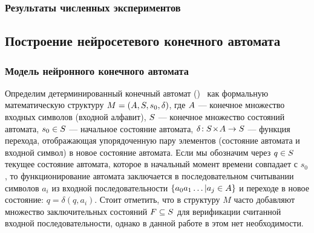 \subsubsection{Результаты численных экспериментов}

\begin{figure}[ht]
    \caption{}
    \label{img:ica_learning_weights}
\end{figure}

\begin{figure}[ht]
    \caption{}
    \label{img:ica_learning_progress}
\end{figure}

\begin{figure}[ht]
    \caption{}
    \label{img:ica_modeling_result}
\end{figure}


\subsection{Построение нейросетевого конечного автомата}


\subsubsection{Модель нейронного конечного автомата}

Определим детерминированный конечный автомат ()~\cite{Hopcroft2008} как формальную математическую структуру $M = \left( A, S, s_{0}, \delta \right)$, где $A$ --- конечное множество входных символов (входной алфавит), $S$ --- конечное множество состояний автомата, $s_{0} \in S$ --- начальное состояние автомата, $\delta\!: S\!\times\!A \to S$ --- функция перехода, отображающая упорядоченную пару элементов (состояние автомата и входной символ) в новое состояние автомата. Если мы обозначим через $q \in S$ текущее состояние автомата, которое в начальный момент времени совпадает с $s_{0}$, то функционирование автомата заключается в последовательном считывании символов $a_{i}$ из входной последовательности $\left\{ a_{0} a_{1} \ldots | a_{j} \in A \right\}$ и переходе в новое состояние: $q = \delta \left( q, a_{i} \right)$. Стоит отметить, что в структуру $M$ часто добавляют множество \socalled заключительных состояний $F \subseteq S$ для верификации считанной входной последовательности, однако в данной работе в этом нет необходимости.

